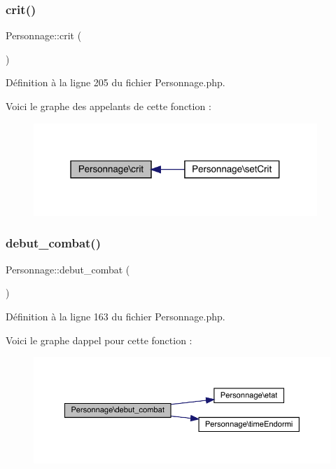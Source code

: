\subsubsection{\texorpdfstring{crit()}{crit()}}
{\footnotesize\ttfamily Personnage\+::crit (\begin{DoxyParamCaption}{ }\end{DoxyParamCaption})}



Définition à la ligne 205 du fichier Personnage.\+php.

Voici le graphe des appelants de cette fonction \+:\nopagebreak
\begin{figure}[H]
\begin{center}
\leavevmode
\includegraphics[width=304pt]{class_personnage_ae91b38c8dfaceca0eda40ae2ea66b99d_icgraph}
\end{center}
\end{figure}
\mbox{\label{class_personnage_a570935e88aa03fb191a3f06a41f5aec5}} 
\subsubsection{\texorpdfstring{debut\+\_\+combat()}{debut\_combat()}}
{\footnotesize\ttfamily Personnage\+::debut\+\_\+combat (\begin{DoxyParamCaption}{ }\end{DoxyParamCaption})}



Définition à la ligne 163 du fichier Personnage.\+php.

Voici le graphe d\textquotesingle{}appel pour cette fonction \+:\nopagebreak
\begin{figure}[H]
\begin{center}
\leavevmode
\includegraphics[width=350pt]{class_personnage_a570935e88aa03fb191a3f06a41f5aec5_cgraph}
\end{center}
\end{figure}
\mbox{\label{class_personnage_adcc095fcc5f137e90860386b4b977817}} 
